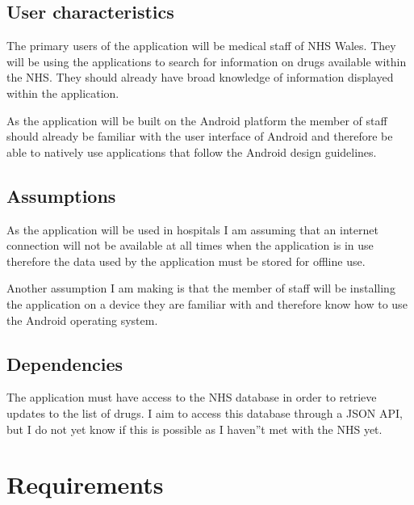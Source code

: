 \documentclass[11pt,fleqn,twoside]{article}
\begin{document}
\subsection{User characteristics}
The primary users of the application will be medical staff of NHS Wales. They will be using the applications to search for information on drugs available within the NHS. They should already have broad knowledge of information displayed within the application. 

As the application will be built on the Android platform the member of staff should already be familiar with the user interface of Android and therefore be able to natively use applications that follow the Android design guidelines.

\subsection{Assumptions}
As the application will be used in hospitals I am assuming that an internet connection will not be available at all times when the application is in use therefore the data used by the application must be stored for offline use.

Another assumption I am making is that the member of staff will be installing the application on a device they are familiar with and therefore know how to use the Android operating system.

\subsection{Dependencies}
The application must have access to the NHS database in order to retrieve updates to the list of drugs. I aim to access this database through a JSON API, but I do not yet know if this is possible as I haven''t met with the NHS yet.


\section{Requirements}
\end{document}
